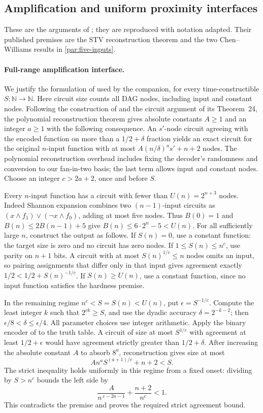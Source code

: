 \subsection{Amplification and uniform proximity interfaces}\label{earlier:release-interfaces}
These are the arguments of \cite[Appendix~B]{NagCG}; they are
reproduced with notation adapted. Their published premises are the
STV reconstruction theorem and the two Chen--Williams results in
\cref{par:five-inputs}.

\paragraph{Full-range amplification interface.}
We justify the formulation of \cite[Lemma~3.9]{CLW20} used by the
companion, for every time-constructible \(S:\mathbb N\to\mathbb N\).
Here circuit size counts all DAG nodes, including input and constant
nodes. Following the construction of \cite[Lemmas~25 and~28]{STV01}
and the circuit argument of its Theorem~24, the polynomial
reconstruction theorem \cite[Theorem~29]{STV01} gives absolute constants
\(A\ge1\) and an integer \(a\ge1\) with the following consequence. An
\(s'\)-node circuit agreeing with the encoded function on more than
a \(1/2+\delta\) fraction yields an exact circuit for the original
\(n\)-input function with at most
\(A(n/\delta)^a s'+n+2\) nodes. The polynomial reconstruction
overhead includes fixing the decoder's randomness and conversion
to our fan-in-two basis; the last term allows input and constant
nodes. Choose an integer \(c>2a+2\), once and before \(S\).

Every \(n\)-input function has a circuit with fewer than
\(U(n)=2^{n+3}\) nodes. Indeed Shannon expansion combines two
\((n-1)\)-input circuits as
\((x\wedge f_1)\vee(\neg x\wedge f_0)\), adding at most five nodes.
Thus \(B(0)=1\) and \(B(n)\le2B(n-1)+5\) give
\(B(n)\le6\cdot2^n-5<U(n)\).
For all sufficiently large \(n\), construct the output as follows.
If \(S(n)=0\), use a constant function: the target size is zero and
no circuit has zero nodes. If \(1\le S(n)\le n^c\), use parity on
\(n+1\) bits. A circuit with at most \(S(n)^{1/c}\le n\) nodes
omits an input, so pairing assignments that differ only in that
input gives agreement exactly \(1/2<1/2+S(n)^{-1/c}\).
If \(S(n)\ge U(n)\), use a constant function, since no input
function satisfies the hardness premise.

In the remaining regime \(n^c<S=S(n)<U(n)\), put
\(\epsilon=S^{-1/c}\). Compute the least integer \(k\) such that
\(2^{ck}\ge S\), and use the dyadic accuracy
\(\delta=2^{-k-2}\); then
\(\epsilon/8<\delta\le\epsilon/4\).
All parameter choices use integer arithmetic. Apply the binary
encoder of \cite[Lemma~28]{STV01} to the truth table.
A circuit of size at most \(S^{1/c}\) with agreement at least
\(1/2+\epsilon\) would have agreement strictly greater than
\(1/2+\delta\). After increasing the absolute constant \(A\) to
absorb \(8^a\), reconstruction gives size at most
\[
 A n^a S^{(a+1)/c}+n+2<S.
\]
The strict inequality holds uniformly in this regime from a fixed
onset: dividing by \(S>n^c\) bounds the left side by
\[
 \frac{A}{n^{\,c-2a-1}}+\frac{n+2}{n^c}<1.
\]
This contradicts the premise and proves the required strict
agreement bound.

